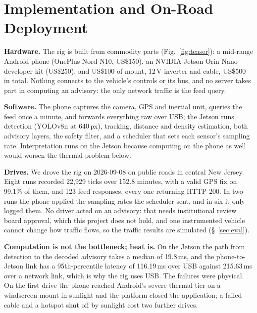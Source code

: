 \section{Implementation and On-Road Deployment}
\label{sec:road}

\noindent\textbf{Hardware.} The rig is built from commodity parts (Fig.~\ref{fig:teaser}): a mid-range Android phone (OnePlus Nord N10, US\$150), an NVIDIA Jetson Orin Nano developer kit (US\$250), and US\$100 of mount, 12\,V inverter and cable, US\$500 in total. Nothing connects to the vehicle's controls or its bus, and no server takes part in computing an advisory: the only network traffic is the feed query.

\noindent\textbf{Software.} The phone captures the camera, GPS and inertial unit, queries the feed once a minute, and forwards everything raw over USB; the Jetson runs detection (YOLOv8n at 640\,px), tracking, distance and density estimation, both advisory layers, the safety filter, and a scheduler that sets each sensor's sampling rate. Interpretation runs on the Jetson because computing on the phone as well would worsen the thermal problem below.

\noindent\textbf{Drives.} We drove the rig on 2026-09-08 on public roads in central New Jersey. Eight runs recorded 22{,}929 ticks over 152.8 minutes, with a valid GPS fix on 99.1\% of them, and 123 feed responses, every one returning HTTP 200. In two runs the phone applied the sampling rates the scheduler sent, and in six it only logged them. No driver acted on an advisory: that needs institutional review board approval, which this project does not hold, and one instrumented vehicle cannot change how traffic flows, so the traffic results are simulated (\S~\ref{sec:eval}).

\noindent\textbf{Computation is not the bottleneck; heat is.} On the Jetson the path from detection to the decoded advisory takes a median of 19.8\,ms, and the phone-to-Jetson link has a 95th-percentile latency of 116.19\,ms over USB against 215.63\,ms over a network link, which is why the rig uses USB. The failures were physical. On the first drive the phone reached Android's severe thermal tier on a windscreen mount in sunlight and the platform closed the application; a failed cable and a hotspot shut off by sunlight cost two further drives.

